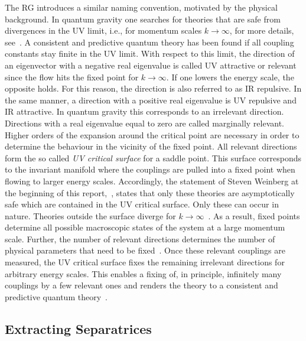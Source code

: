 \documentclass[paper=a4,11pt,bibliography=totoc]{scrartcl}
\begin{document}
The RG introduces a similar naming convention, motivated by the physical background. In quantum gravity one searches for theories that are safe from divergences in the UV limit, i.e., for momentum scales $k\to\infty$, for more details, see~. A consistent and predictive quantum theory has been found if all coupling constants stay finite in the UV limit. With respect to this limit, the direction of an eigenvector with a negative real eigenvalue is called UV attractive or relevant since the flow hits the fixed point for $k\to\infty$. If one lowers the energy scale, the opposite holds. For this reason, the direction is also referred to as IR repulsive. In the same manner, a direction with a positive real eigenvalue is UV repulsive and IR attractive. In quantum gravity this corresponds to an irrelevant direction. Directions with a real eigenvalue equal to zero are called marginally relevant. Higher orders of the expansion around the critical point are necessary in order to determine the behaviour in the vicinity of the fixed point.  All relevant directions form the so called \textit{UV critical surface} for a saddle point. This surface corresponds to the invariant manifold where the couplings are pulled into a fixed point when flowing to larger energy scales. Accordingly, the statement of Steven Weinberg at the beginning of this report,~, states that only these theories are asymptotically safe which are contained in the UV critical surface. Only these can occur in nature. Theories outside the surface diverge for $k\to\infty$~\cite{WikiAsym}. As a result, fixed points determine all possible macroscopic states of the system at a large momentum scale. Further, the number of relevant directions determines the number of physical parameters that need to be fixed~\cite{Scherer2018}. Once these relevant couplings are measured, the UV critical surface fixes the remaining irrelevant directions for arbitrary energy scales. This enables a fixing of, in principle, infinitely many couplings by a few relevant ones and renders the theory to a consistent and predictive quantum theory~\cite{WikiAsym}.

\subsection{Extracting Separatrices}
\end{document}
